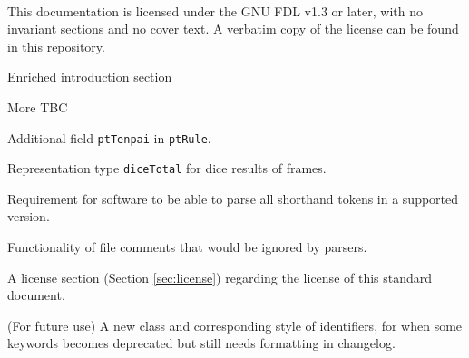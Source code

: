 \documentclass[%
	a4paper%
	,10pt%
	,twoside%
	,notitlepage%
]{article}%
\newcommand*{\github}[1]{\texorpdfstring{\href{https://github.com/#1}{\texttt{#1}}}{#1}}%
\begin{document}
	\paragraph*{}This documentation is licensed under the GNU FDL v1.3 or later, with no invariant sections and no cover text. A verbatim copy of the license can be found in this repository. %
\begin{changelog}[%
	section=true%
	,sectioncmd={\section}%
	,title={Changelog}%
	,label={sec:changelog}%
]%
% 
	\begin{version}[%
		version=\currentVer{}%
		,author={\github{ChemistMikeLam}}%
		,date=\releaseDate{}%
	]%
		\changed{}%
			\item{}Enriched introduction section%
			\item{}More TBC%
	\end{version}%
	\begin{version}[%
		version=1.0.0-β%
		,author={\github{ChemistMikeLam}}%
		,date=Unreleased%
	]%
		\added{}%
			\item{}Additional field \lstinline/ptTenpai/ in \lstinline/ptRule/. %
			\item{}Representation type \lstinline/diceTotal/ for dice results of frames. %
			\item{}Requirement for software to be able to parse all shorthand tokens in a supported version. %
			\item{}Functionality of file comments that would be ignored by parsers. %
			\item{}A license section (Section \ref{sec:license}) regarding the license of this standard document. %
			\item{}(For future use) A new class and corresponding style of identifiers, for when some keywords becomes deprecated but still needs formatting in changelog. %

\end{version}
\end{changelog}
\end{document}

